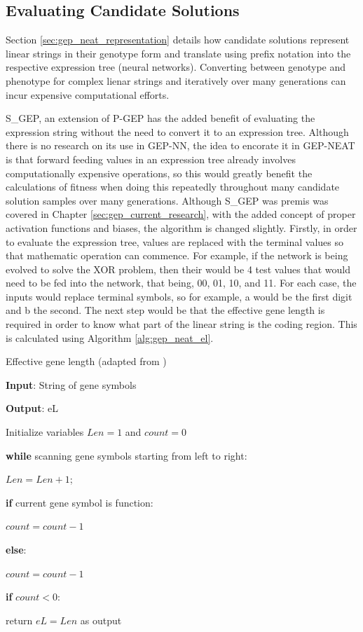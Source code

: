 \subsection{Evaluating Candidate Solutions}
Section \ref{sec:gep_neat_representation} details how candidate solutions represent linear strings in their genotype form and translate using prefix notation into the respective expression tree (neural networks). Converting between genotype and phenotype for complex lienar strings and iteratively over many generations can incur expensive computational efforts. \bigskip

\noindent S\_GEP, an extension of P-GEP has the added benefit of evaluating the expression string without the need to convert it to an expression tree. Although there is no research on its use in GEP-NN, the idea to encorate it in GEP-NEAT is that forward feeding values in an expression tree already involves computationally expensive operations, so this would greatly benefit the calculations of fitness when doing this repeatedly throughout many candidate solution samples over many generations. Although S\_GEP was premis was covered in Chapter \ref{sec:gep_current_research}, with the added concept of proper activation functions and biases, the algorithm is changed slightly. Firstly, in order to evaluate the expression tree, values are replaced with the terminal values so that mathematic operation can commence. For example, if the network is being evolved to solve the XOR problem, then their would be 4 test values that would need to be fed into the network, that being, 00, 01, 10, and 11. For each case, the inputs would replace terminal symbols, so for example, a would be the first digit and b the second. The next step would be that the effective gene length is required in order to know what part of the linear string is the coding region. This is calculated using Algorithm \ref{alg:gep_neat_el}.

\begin{algorithm}
	\caption{Effective gene length (adapted from \cite{peng2014improved})}\label{alg:gep_neat_el}
	\begin{algorithmic}[1]
	\item \textbf{Input}: String of gene symbols
	\item \textbf{Output}: eL
	\item Initialize variables $Len=1$ and $count=0$
	\item \textbf{while} scanning gene symbols starting from left to right:
	\item \quad $Len = Len + 1$;
	\item \quad \textbf{if} current gene symbol is function:
	\item \quad \quad $count = count - 1$
	\item \quad \textbf{else}:
	\item \quad \quad $count = count - 1$
	\item \quad \textbf{if} $count < 0$:
	\item \quad \quad return $eL=Len$ as output
\end{algorithmic}
\end{algorithm}

